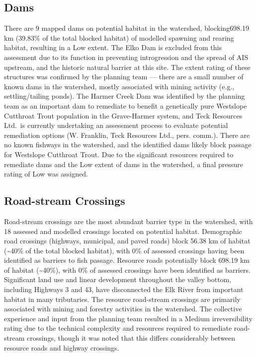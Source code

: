 \documentclass[
  letterpaper,
  DIV=11,
  numbers=noendperiod]{scrreprt}
\begin{document}
\subsection*{Dams}\label{dams}

There are 9 mapped dams on potential habitat in the watershed,
blocking698.19 km (39.83\% of the total blocked habitat) of modelled
spawning and rearing habitat, resulting in a Low extent. The Elko Dam is
excluded from this assessment due to its function in preventing
introgression and the spread of AIS upstream, and the historic natural
barrier at this site. The extent rating of these structures was
confirmed by the planning team --- there are a small number of known
dams in the watershed, mostly associated with mining activity (e.g.,
settling/tailing ponds). The Harmer Creek Dam was identified by the
planning team as an important dam to remediate to benefit a genetically
pure Westslope Cutthroat Trout population in the Grave-Harmer system,
and Teck Resources Ltd.~is currently undertaking an assessment process
to evaluate potential remediation options (W. Franklin, Teck Resources
Ltd., pers. comm.). There are no known fishways in the watershed, and
the identified dams likely block passage for Westslope Cutthroat Trout.
Due to the significant resources required to remediate dams and the Low
extent of dams in the watershed, a final pressure rating of Low was
assigned.

\subsection*{Road-stream Crossings}\label{road-stream-crossings}

Road-stream crossings are the most abundant barrier type in the
watershed, with 18 assessed and modelled crossings located on potential
habitat. Demographic road crossings (highways, municipal, and paved
roads) block 56.38 km of habitat (\textasciitilde40\% of the total
blocked habitat), with 0\% of assessed crossings having been identified
as barriers to fish passage. Resource roads potentially block 698.19 km
of habitat (\textasciitilde40\%), with 0\% of assessed crossings have
been identified as barriers. Significant land use and linear development
throughout the valley bottom, including Highways 3 and 43, have
disconnected the Elk River from important habitat in many tributaries.
The resource road-stream crossings are primarily associated with mining
and forestry activities in the watershed. The collective experience and
input from the planning team resulted in a Medium irreversibility rating
due to the technical complexity and resources required to remediate
road-stream crossings, though it was noted that this differs
considerably between resource roads and highway crossings.
\end{document}
